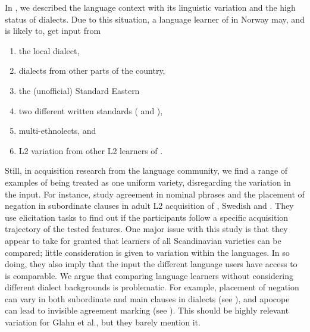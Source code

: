\documentclass[output=paper,colorlinks,citecolor=brown,modfonts,nonflat]{../langscibook}
\begin{document}
In , we described the  language context with its linguistic variation and the high status of dialects. Due to this situation, a language learner of  in Norway may, and is likely to, get input from 

\begin{enumerate}[label=\alph*.]
\item the local dialect, 
\item dialects from other parts of the country, 
\item the (unofficial) Standard Eastern  
\item two different written standards ( and ), 
\item multi-ethnolects, and 
\item L2  variation from other L2 learners of .
\end{enumerate}
Still, in acquisition research from the  language community, we find a range of examples of  being treated as one uniform variety, disregarding the variation in the input. For instance, \citet{GlahnEtAl2001} study agreement in nominal phrases and the placement of negation in subordinate clauses in adult L2 acquisition of , Swedish and . They use elicitation tasks to find out if the participants follow a specific acquisition trajectory of the tested features. One major issue with this study is that they appear to take for granted that learners of all Scandinavian varieties can be compared; little consideration is given to variation within the languages. In so doing, they also imply that the input the different language users have access to is comparable. We argue that comparing language learners without considering different dialect backgrounds is problematic. For example, placement of negation can vary in both subordinate and main clauses in  dialects (see \citealt{Bentzen2007}), and apocope can lead to invisible agreement marking (see ). This should be highly relevant variation for Glahn et al., but they barely mention it. 
\end{document}
